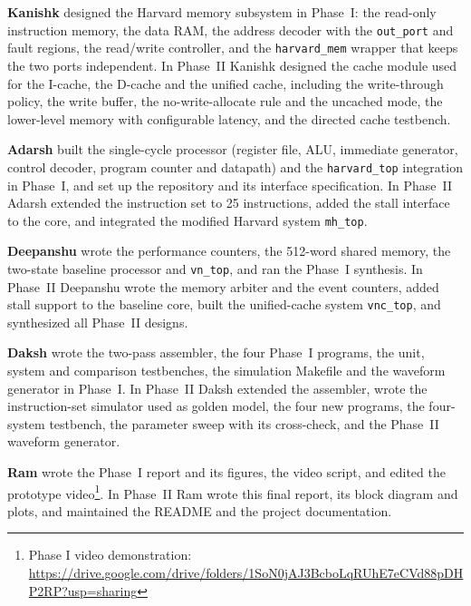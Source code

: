 \documentclass[conference]{IEEEtran}
\newcommand{\MemA}{Kanishk}     %
\newcommand{\MemB}{Adarsh}      %
\newcommand{\MemC}{Deepanshu}   %
\newcommand{\MemD}{Daksh}       %
\newcommand{\MemE}{Ram}         %
\begin{document}
\textbf{\MemA} designed the Harvard memory subsystem in Phase~I: the
read-only instruction memory, the data RAM, the address decoder with the
\texttt{out\_port} and fault regions, the read/write controller, and the
\texttt{harvard\_mem} wrapper that keeps the two ports independent. In
Phase~II \MemA{} designed the cache module used for the I-cache, the D-cache
and the unified cache, including the write-through policy, the write
buffer, the no-write-allocate rule and the uncached mode, the lower-level
memory with configurable latency, and the directed cache testbench.

\textbf{\MemB} built the single-cycle processor (register file, ALU,
immediate generator, control decoder, program counter and datapath) and the
\texttt{harvard\_top} integration in Phase~I, and set up the repository and
its interface specification. In Phase~II \MemB{} extended the instruction
set to 25 instructions, added the stall interface to the core, and
integrated the modified Harvard system \texttt{mh\_top}.

\textbf{\MemC} wrote the performance counters, the 512-word shared memory,
the two-state baseline processor and \texttt{vn\_top}, and ran the Phase~I
synthesis. In Phase~II \MemC{} wrote the memory arbiter and the event
counters, added stall support to the baseline core, built the unified-cache
system \texttt{vnc\_top}, and synthesized all Phase~II designs.

\textbf{\MemD} wrote the two-pass assembler, the four Phase~I programs, the
unit, system and comparison testbenches, the simulation Makefile and the
waveform generator in Phase~I. In Phase~II \MemD{} extended the assembler,
wrote the instruction-set simulator used as golden model, the four new
programs, the four-system testbench, the parameter sweep with its
cross-check, and the Phase~II waveform generator.

\textbf{\MemE} wrote the Phase~I report and its figures, the video script,
and edited the prototype video\footnote{Phase I video demonstration: \url{https://drive.google.com/drive/folders/1SoN0jAJ3BcboLqRUhE7eCVd88pDHP2RP?usp=sharing}}.
In Phase~II \MemE{} wrote this final report, its block diagram and plots,
and maintained the README and the project documentation.

\end{document}
